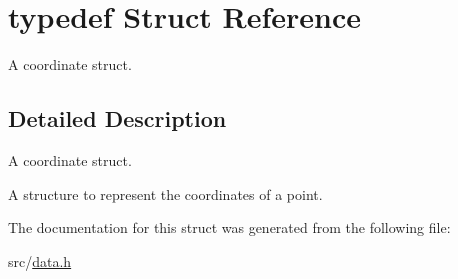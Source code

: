 \hypertarget{structtypedef}{\section{typedef Struct Reference}
\label{structtypedef}
}


A coordinate struct.  




\subsection{Detailed Description}
A coordinate struct. 

A structure to represent the coordinates of a point. 

The documentation for this struct was generated from the following file\+:\begin{DoxyCompactItemize}
\item 
src/\hyperlink{data_8h}{data.\+h}\end{DoxyCompactItemize}
